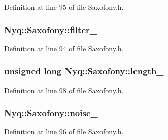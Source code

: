 Definition at line 95 of file Saxofony.\+h.

\subsubsection[{\texorpdfstring{filter\+\_\+}{filter_}}]{ Nyq\+::\+Saxofony\+::filter\+\_\+\hspace{0.3cm}{\ttfamily [protected]}}\hypertarget{class_nyq_1_1_saxofony_ae019d4be43b19210316312d00f6ae291}{}\label{class_nyq_1_1_saxofony_ae019d4be43b19210316312d00f6ae291}


Definition at line 94 of file Saxofony.\+h.

\subsubsection[{\texorpdfstring{length\+\_\+}{length_}}]{\setlength{\rightskip}{0pt plus 5cm}unsigned long Nyq\+::\+Saxofony\+::length\+\_\+\hspace{0.3cm}{\ttfamily [protected]}}\hypertarget{class_nyq_1_1_saxofony_a2c2aad28530ae146acd0b0baf7998ba8}{}\label{class_nyq_1_1_saxofony_a2c2aad28530ae146acd0b0baf7998ba8}


Definition at line 98 of file Saxofony.\+h.

\subsubsection[{\texorpdfstring{noise\+\_\+}{noise_}}]{ Nyq\+::\+Saxofony\+::noise\+\_\+\hspace{0.3cm}{\ttfamily [protected]}}\hypertarget{class_nyq_1_1_saxofony_ace6ceb3b855a5b4b24e78cc2196db73c}{}\label{class_nyq_1_1_saxofony_ace6ceb3b855a5b4b24e78cc2196db73c}


Definition at line 96 of file Saxofony.\+h.

